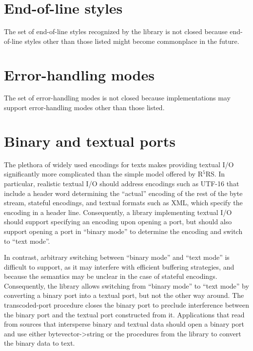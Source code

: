 \documentclass[twoside,twocolumn]{algol60}
\newcommand{\rn}[1]{R$^{#1}$RS}
\begin{document}
\section{End-of-line styles}

The set of end-of-line styles recognized by the 
library is not closed because end-of-line styles other than those
listed might become commonplace in the future.

\section{Error-handling modes}

The set of error-handling modes is not closed because implementations
may support error-handling modes other than those listed.

\section{Binary and textual ports}

The plethora of widely used encodings for texts makes providing
textual I/O significantly more complicated than the simple model
offered by \rn{5}.  In particular, realistic textual I/O should
address encodings such as UTF-16 that include a header word
determining the ``actual'' encoding of the rest of the byte stream,
stateful encodings, and textual formats such as XML, which specify the
encoding in a header line.  Consequently, a library implementing
textual I/O should support specifying an encoding upon opening a port,
but should also support opening a port in ``binary mode'' to determine
the encoding and switch to ``text mode''.

In contrast, arbitrary switching between ``binary mode'' and ``text
mode'' is difficult to support, as it may interfere with efficient
buffering strategies, and because the semantics may be unclear in the
case of stateful encodings.  Consequently, the 
library allows switching from ``binary mode'' to ``text mode'' by
converting a binary port into a textual port, but not the other way
around.  The {\cf transcoded-port} procedure closes the binary port to
preclude interference between the binary port and the textual port
constructed from it.  Applications that read from sources that
intersperse binary and textual data should open a binary port and use
either {\cf bytevector->string} or the procedures from the
 library to convert the binary data to text.
\end{document}
